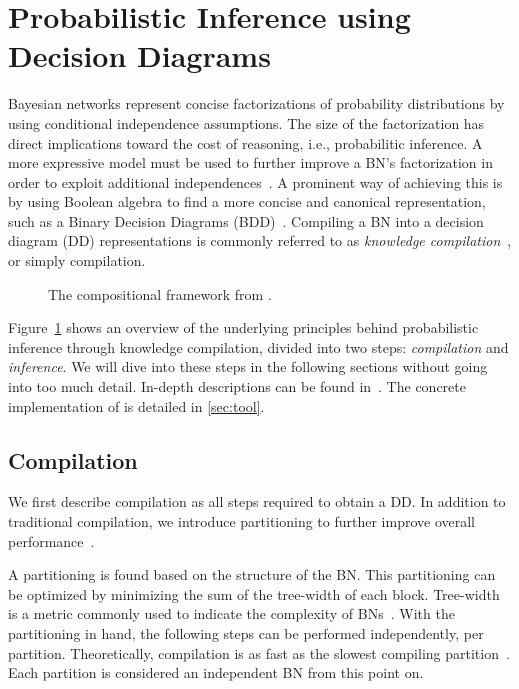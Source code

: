 
\section{Probabilistic Inference using Decision Diagrams}\label{sec:parallel}


Bayesian networks represent concise factorizations of probability distributions by using conditional independence assumptions. The size of the factorization has direct implications toward the cost of reasoning, i.e., probabilitic inference. A more expressive model must be used to further improve a BN's factorization in order to exploit additional independences~\cite{boutilier1996context,friedman1998learning,zhang1996exploiting}. A prominent way of achieving this is by using Boolean algebra to find a more concise and canonical representation, such as a Binary Decision Diagrams (BDD)~\cite{bryant1986graph}. Compiling a BN into a decision diagram (DD) representations is commonly referred to as \emph{knowledge compilation}~\cite{darwiche2002knowledge}, or simply compilation.

\begin{figure}[!t]
    \centering
    \scalebox{0.9}{
        
    }
    \caption{The compositional framework from \cite{dal2021compositional}.}
    \label{fig:frameworkoverview}
\end{figure}


Figure~\ref{fig:frameworkoverview} shows an overview of the underlying principles behind probabilistic inference through knowledge compilation, divided into two steps: \emph{compilation} and \emph{inference}. We will dive into these steps in the following sections without going into too much detail. In-depth descriptions can be found in~\cite{dal2021compositional}. The concrete implementation of \toolname is detailed in \autoref{sec:tool}.

\subsection{Compilation}

We first describe compilation as all steps required to obtain a DD. In addition to traditional compilation, we introduce partitioning to further improve overall performance~\cite{dal2017reducing}.

A partitioning is found based on the structure of the BN. This partitioning can be optimized by minimizing the sum of the tree-width of each block. Tree-width is a metric commonly used to indicate the complexity of BNs~\cite{bollig2014width}. With the partitioning in hand, the following steps can be performed independently, per partition. Theoretically, compilation is as fast as the slowest compiling partition~\cite{dal2018parallel}. Each partition is considered an independent BN from this point on.

